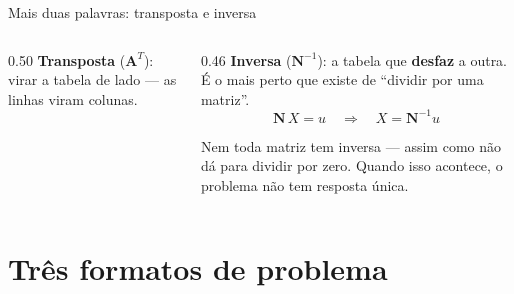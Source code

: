 \documentclass[aspectratio=169,11pt]{beamer}
\newcommand{\bnum}[1]{\textbf{\textcolor{mTeal}{#1}}}
\begin{document}
\begin{frame}{Mais duas palavras: transposta e inversa}
  \begin{columns}[T]
    \begin{column}{0.50\textwidth}
      \textbf{Transposta} ($\mathbf{A}^T$): virar a tabela de lado --- as linhas viram
      colunas.
      \medskip
      \centering
    \end{column}
    \begin{column}{0.46\textwidth}
      \textbf{Inversa} ($\mathbf{N}^{-1}$): a tabela que \bnum{desfaz} a outra.
      É o mais perto que existe de ``dividir por uma matriz''.
      \[ \mathbf{N}\,X = u \quad\Longrightarrow\quad X = \mathbf{N}^{-1} u \]
      \medskip
      \begin{cuidado}[title={Guarde esta frase}]
        \small Nem toda matriz tem inversa --- assim como não dá para dividir por zero.
        Quando isso acontece, \alert{o problema não tem resposta única}.
      \end{cuidado}
    \end{column}
  \end{columns}
\end{frame}

\section{Três formatos de problema}
\end{document}
